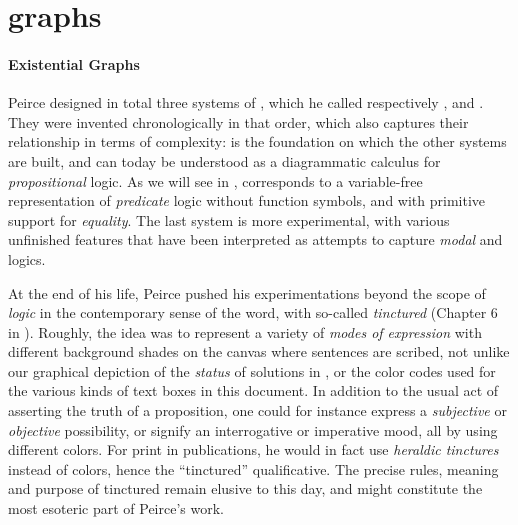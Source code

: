 \section{ graphs}

\paragraph{Existential Graphs}

\AP
Peirce designed in total three systems of , which he called respectively
,  and . They were invented
chronologically in that order, which also captures their relationship in terms
of complexity:  is the foundation on which the other systems are
built, and can today be understood as a diagrammatic calculus for 
\emph{propositional} logic. As we will see in , 
corresponds to a variable-free representation of \emph{predicate} logic without
function symbols, and with primitive support for \emph{equality}. The last
system  is more experimental, with various unfinished features that
have been interpreted as attempts to capture \emph{modal}
 and \emph{} logics.

\begin{digression}
At the end of his life, Peirce pushed his experimentations beyond the scope of
\emph{logic} in the contemporary sense of the word, with so-called
\emph{tinctured}  (Chapter 6 in \cite{Roberts+1973}). Roughly,
the idea was to represent a variety of \emph{modes of expression} with different
background shades on the canvas where sentences are scribed, not unlike our
graphical depiction of the \emph{status} of solutions in ,
or the color codes used for the various kinds of text boxes in this document. In
addition to the usual act of asserting the truth of a proposition, one could for
instance express a \emph{subjective} or \emph{objective} possibility, or signify
an interrogative or imperative mood, all by using different colors. For print in
publications, he would in fact use \emph{heraldic tinctures} instead of colors,
hence the ``tinctured'' qualificative. The precise rules, meaning and purpose of
tinctured  remain elusive to this day, and might constitute the most
esoteric part of Peirce's work.
\end{digression}

